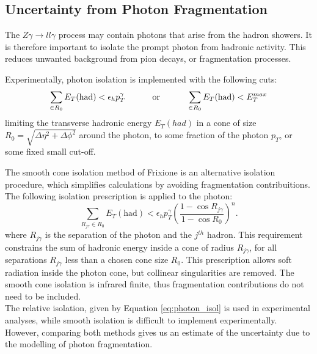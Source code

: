 \documentclass[11pt,a4paper]{report}
\newcommand{\Zg}{$Z\gamma\to ll\gamma$ }
\begin{document}

\subsection{Uncertainty from Photon Fragmentation}
The \Zg process may contain photons that arise from the hadron showers. It is therefore important to isolate the prompt photon from hadronic activity. This reduces unwanted background from pion decays, or fragmentation processes.

Experimentally, photon isolation is implemented with the following cuts:
\begin{equation}
\sum_{\in R_0} E_T(\text{had}) < \epsilon_h p_T^\gamma \text{\hspace{1cm} or \hspace{1cm}} \sum_{\in R_0} E_T(\text{had}) < E_T^{max}
\end{equation}
\label{eq:photon_isol}
limiting the transverse hadronic energy $E_T(had)$ in a cone of size $R_0 = \sqrt{\Delta\eta^2 + \Delta\phi^2}$ around the photon, to some fraction of the photon $p_T$, or some fixed small cut-off.

The smooth cone isolation method of Frixione \cite{frixione} is an alternative isolation procedure, which simplifies calculations by avoiding fragmentation contribuitions. The following isolation prescription is applied to the photon:
\begin{equation}
	\sum_{R_{j\gamma} \in R_0} E_T(\text{had}) < \epsilon_h p_T^\gamma \left(\frac{1-\cos R_{j\gamma}}{1-\cos R_0}\right)^n.
\end{equation}
\label{eq:frix_isol}
where $R_{j\gamma}$ is the separation of the photon and the $j^{th}$ hadron. This requirement constrains the sum of hadronic energy inside a cone of radius $R_{j\gamma}$, for all separations $R_{j\gamma}$ less than a chosen cone size $R_0$. This prescription allows soft radiation inside the photon cone, but collinear singularities are removed. The smooth cone isolation is infrared finite, thus fragmentation contributions do not need to be included.\\
The relative isolation, given by Equation \ref{eq:photon_isol} is used in experimental analyses, while smooth isolation is difficult to implement experimentally. However, comparing both methods gives us an estimate of the uncertainty due to the modelling of photon fragmentation.
\end{document}
